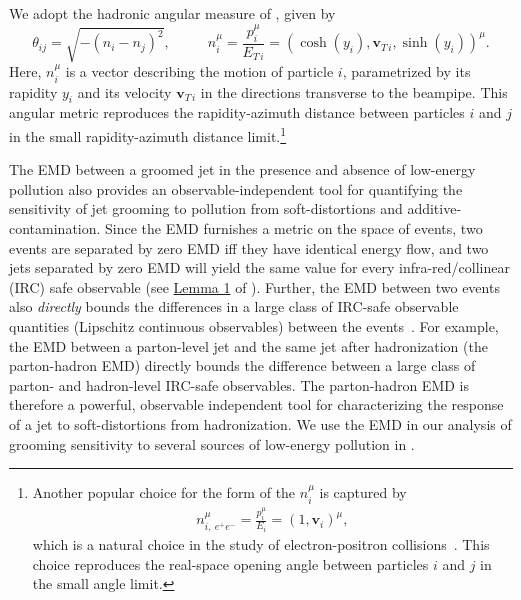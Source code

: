 We adopt the hadronic angular measure of , given by
\begin{equation}
    \theta_{ij} = \sqrt{-(n_i - n_j)^2}
    ,
    ~~~~~~
    ~~~~~~
    n_{i}^\mu = \frac{p_i^\mu}{E_{T\,i}} = (\cosh(y_i), \textbf{v}_{T\,i}, \sinh(y_i))^\mu
    .
    \label{eq:hadronic_metric}
\end{equation}
Here, \(n_i^\mu\) is a vector describing the motion of particle \(i\), parametrized by its rapidity \(y_i\) and its velocity \(\textbf{v}_{T\, i}\) in the directions transverse to the beampipe.
%
This angular metric reproduces the rapidity-azimuth distance between particles \(i\) and \(j\) in the small rapidity-azimuth distance limit.\footnote{
Another popular choice for the form of the \(n_i^\mu\) is captured by
\begin{align}
    \label{eq:ee_metric}
    n_{i,~{e^+e^-}}^\mu = \frac{p_i^\mu}{E_i} = (1, \textbf{v}_i)^\mu
    ,
\end{align}
which is a natural choice in the study of electron-positron collisions~\cite{Komiske:2020qhg}.
%
This choice reproduces the real-space opening angle between particles \(i\) and \(j\) in the small angle limit.
}

The EMD between a groomed jet in the presence and absence of low-energy pollution also provides an observable-independent tool for quantifying the sensitivity of jet grooming to pollution from \glspl{soft-distortion} and \gls{additive-contamination}.
%
Since the EMD furnishes a metric on the space of events, two events are separated by zero EMD iff they have identical energy flow, and two jets separated by zero EMD will yield the same value for every infra-red/collinear (IRC) safe observable (see \href{https://arxiv.org/pdf/2004.04159.pdf#page=11\&zoom=100,0,650}{Lemma 1} of ).
%
Further, the EMD between two events also \textit{directly} bounds the differences in a large class of IRC-safe observable quantities (Lipschitz continuous observables) between the events~\cite{Komiske:2019fks}.
%
For example, the EMD between a parton-level jet and the same jet after \gls{hadronization} (the parton-hadron EMD) directly bounds the difference between a large class of parton- and hadron-level IRC-safe observables.
%
The parton-hadron EMD is therefore a powerful, observable independent tool for characterizing the response of a jet to \glspl{soft-distortion} from \gls{hadronization}.
%
We use the EMD in our analysis of grooming sensitivity to several sources of low-energy pollution in .


